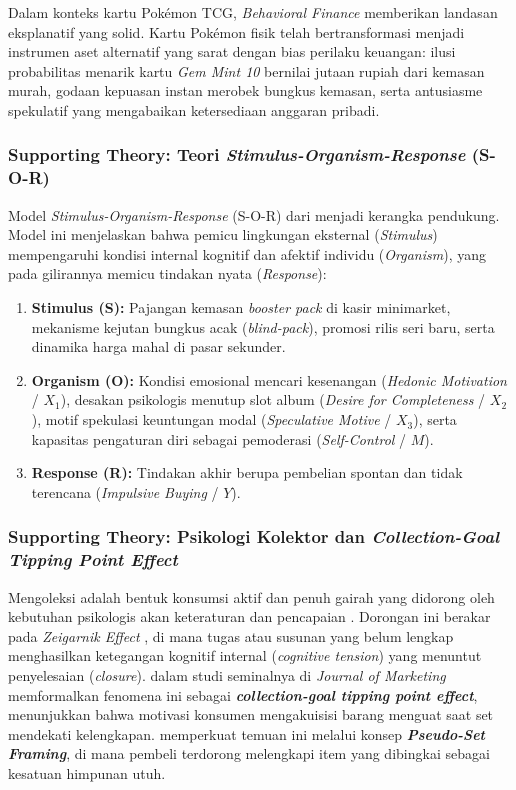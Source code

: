 \documentclass[12pt,a4paper]{article}
\numberwithin{equation}{section}
\numberwithin{table}{section}
\numberwithin{figure}{section}
\begin{document}
Dalam konteks kartu Pok\'emon TCG, \emph{Behavioral Finance} memberikan landasan eksplanatif yang solid. Kartu Pok\'emon fisik telah bertransformasi menjadi instrumen aset alternatif yang sarat dengan bias perilaku keuangan: ilusi probabilitas menarik kartu \emph{Gem Mint 10} bernilai jutaan rupiah dari kemasan murah, godaan kepuasan instan merobek bungkus kemasan, serta antusiasme spekulatif yang mengabaikan ketersediaan anggaran pribadi.

\subsubsection{Supporting Theory: Teori \emph{Stimulus-Organism-Response} (S-O-R)}

Model \emph{Stimulus-Organism-Response} (S-O-R) dari \citet{mehrabian1974approach} menjadi kerangka pendukung. Model ini menjelaskan bahwa pemicu lingkungan eksternal (\emph{Stimulus}) mempengaruhi kondisi internal kognitif dan afektif individu (\emph{Organism}), yang pada gilirannya memicu tindakan nyata (\emph{Response}):
\begin{enumerate}
  \item \textbf{Stimulus (S):} Pajangan kemasan \emph{booster pack} di kasir minimarket, mekanisme kejutan bungkus acak (\emph{blind-pack}), promosi rilis seri baru, serta dinamika harga mahal di pasar sekunder.
  \item \textbf{Organism (O):} Kondisi emosional mencari kesenangan (\emph{Hedonic Motivation} / $X_1$), desakan psikologis menutup slot album (\emph{Desire for Completeness} / $X_2$), motif spekulasi keuntungan modal (\emph{Speculative Motive} / $X_3$), serta kapasitas pengaturan diri sebagai pemoderasi (\emph{Self-Control} / $M$).
  \item \textbf{Response (R):} Tindakan akhir berupa pembelian spontan dan tidak terencana (\emph{Impulsive Buying} / $Y$).
\end{enumerate}

\subsubsection{Supporting Theory: Psikologi Kolektor dan \emph{Collection-Goal Tipping Point Effect}}

Mengoleksi adalah bentuk konsumsi aktif dan penuh gairah yang didorong oleh kebutuhan psikologis akan keteraturan dan pencapaian \citep{belk1995collecting}. Dorongan ini berakar pada \emph{Zeigarnik Effect} \citep{zeigarnik1927behalten}, di mana tugas atau susunan yang belum lengkap menghasilkan ketegangan kognitif internal (\emph{cognitive tension}) yang menuntut penyelesaian (\emph{closure}). \citet{gao2014completing} dalam studi seminalnya di \emph{Journal of Marketing} memformalkan fenomena ini sebagai \textbf{\emph{collection-goal tipping point effect}}, menunjukkan bahwa motivasi konsumen mengakuisisi barang menguat saat set mendekati kelengkapan. \citet{barasz2017pseudo} memperkuat temuan ini melalui konsep \textbf{\emph{Pseudo-Set Framing}}, di mana pembeli terdorong melengkapi item yang dibingkai sebagai kesatuan himpunan utuh.
\end{document}
